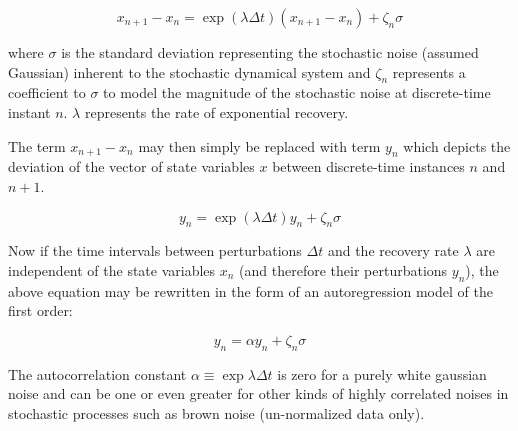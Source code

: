 \begin{equation}
	x_{n+1} - x_{n} = \exp{(\lambda \Delta t)}(x_{n+1}-x_{n}) + \zeta_n\sigma
\end{equation}

\hspace{25pt} where $\sigma$ is the standard deviation representing the stochastic noise (assumed Gaussian) inherent to the stochastic dynamical system and $\zeta_n$ represents a coefficient to $\sigma$ to model the magnitude of the stochastic noise at discrete-time instant $n$. $\lambda$ represents the rate of exponential recovery.

The term $x_{n+1} - x_{n}$ may then simply be replaced with term $y_n$ which depicts the deviation of the vector of state variables $x$ between discrete-time instances $n$ and $n+1$.

\begin{equation}
	y_{n} = \exp{(\lambda \Delta t)}y_n + \zeta_n
	\sigma
\end{equation}

Now if the time intervals between perturbations $\Delta t$ and the recovery rate $\lambda$ are independent of the state variables $x_{n}$ (and therefore their perturbations $y_{n}$), the above equation may be rewritten in the form of an autoregression model of the first order:

\begin{equation}
	y_{n} = \alpha y_{n} + \zeta_n\sigma
\end{equation}

The autocorrelation constant $\alpha \equiv \exp{\lambda \Delta t}$ is zero for a purely white gaussian noise and can be one or even greater for other kinds of highly correlated noises in stochastic processes such as brown noise (un-normalized data only).

 